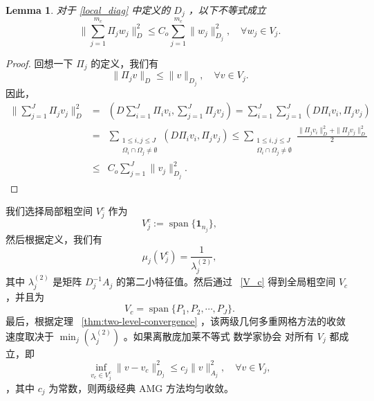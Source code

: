 \documentclass[12pt]{acta_2011xz}
\newcommand{\co}{\ensuremath{C_{o}}}
\newtheorem{lemma}[theorem]{Lemma}
\begin{document}
   \begin{lemma}   \label{lem:Dj}    对于    \eqref{local_diag}    中定义的    $D_j$   ，以下不等式成立
   \begin{equation}
        \|\sum_{j=1}^{m_c}\Pi_jw_j\|_D^2\le \co\sum_{j=1}^{m_c}\|w_j\|_{D_j}^2, \quad \forall w_j\in V_j.
    \end{equation}     \end{lemma}    
   \begin{proof}回想一下    $\Pi_j$    的定义，我们有 
   \begin{equation}
        \|\Pi_jv\|_D\le \|v\|_{D_j}, \quad \forall v\in V_j.
    \end{equation}    因此，
   \begin{eqnarray*}
        \|\sum_{j=1}^{J}\Pi_jv_j\|_D^2 &= & \left(D\sum_{i=1}^{J}\Pi_iv_i, \sum_{j=1}^{J}\Pi_jv_j\right)=  \sum_{i=1}^{J}\sum_{j=1}^{J}(D\Pi_iv_i, \Pi_jv_j) \\ 
                  &= & \sum_{\substack{1\le i, j\le J \\ \Omega_i\cap\Omega_j\ne \emptyset}}(D\Pi_iv_i, \Pi_jv_j)\le  \sum_{\substack{1\le i, j\le J \\ \Omega_i\cap\Omega_j\ne \emptyset}}\frac{\|\Pi_jv_i\|_D^2+\|\Pi_jv_j\|_D^2}{2} \\ 
                  &\le & \co\sum_{j=1}^{J}\|v_j\|_{D_j}^2. 
    \end{eqnarray*}     \end{proof}    我们选择局部粗空间    $V_j^c$    作为
   \begin{equation}
    V_j^c:=\operatorname{span} \{ \bm 1_{n_j} \} ,
\end{equation}    然后根据定义，我们有
   \begin{equation}
    \mu_j(V_j^c)=\frac{1}{\lambda_j^{(2)}},
\end{equation}    其中    $\lambda_j^{(2)}$    是矩阵    $D_j^{-1}A_j$    的第二小特征值。然后通过~    \eqref{V_c}    得到全局粗空间    $V_c$    ，并且为
   \begin{equation}
    V_c=\operatorname{span} \{ P_1, P_2, \cdots, P_J \} .
\end{equation}    最后，根据定理~    \ref{thm:two-level-convergence}    ，该两级几何多重网格方法的收敛速度取决于
   $\min_j(\lambda_j^{(2)})$    。如果离散庞加莱不等式  { 数学家协会   }  对所有    $V_j$    都成立，即
   \begin{equation}\label{local_poincare}
    \inf_{v_c\in V_j^c} \|v-v_c\|_{D_j}^2\le c_j\|v\|_{A_j}^2, \quad \forall v\in V_j,
\end{equation}    ，其中    $c_j$    为常数，则两级经典 AMG 方法均匀收敛。  
\end{document}
